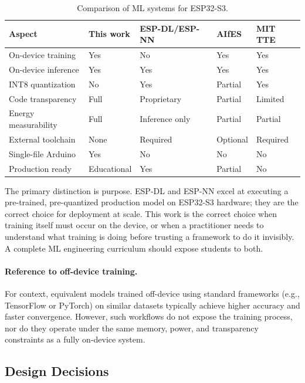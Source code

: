 \documentclass[12pt]{article}
\begin{document}
\begin{table}[H]
\centering
\caption{Comparison of ML systems for ESP32-S3.}
\label{tab:comparison}
\begin{tabular}{p{3.8cm} p{1.8cm} p{1.8cm} p{1.4cm} p{1.4cm}}
\toprule
\textbf{Aspect} & \textbf{This work} & \textbf{ESP-DL/ESP-NN} & \textbf{AIfES} & \textbf{MIT TTE} \\
\midrule
On-device training    & Yes  & No          & Yes     & Yes \\
On-device inference   & Yes  & Yes         & Yes     & Yes \\
INT8 quantization     & No   & Yes         & Partial & Yes \\
Code transparency     & Full & Proprietary & Partial & Limited \\
Energy measurability  & Full & Inference only & Partial & Partial \\
External toolchain    & None & Required    & Optional & Required \\
Single-file Arduino   & Yes  & No          & No      & No \\
Production ready      & Educational & Yes      & Partial & No \\
\bottomrule
\end{tabular}
\end{table}

The primary distinction is purpose.
ESP-DL and ESP-NN excel at executing a pre-trained, pre-quantized production
model on ESP32-S3 hardware; they are the correct choice for deployment at scale.
This work is the correct choice when training itself must occur on the device,
or when a practitioner needs to understand what training is doing before trusting
a framework to do it invisibly.
A complete ML engineering curriculum should expose students to both.

\paragraph{Reference to off-device training.}
For context, equivalent models trained off-device using standard frameworks
(e.g., TensorFlow or PyTorch) on similar datasets typically achieve higher
accuracy and faster convergence.
However, such workflows do not expose the training process, nor do they operate
under the same memory, power, and transparency constraints as a fully on-device
system.

\subsection{Design Decisions}
\label{subsec:design}
\end{document}
